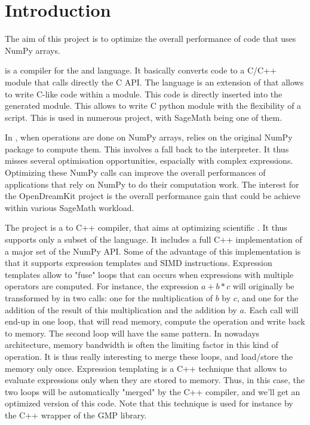 \documentclass{deliverablereport}
\author{Adrien Guinet et Clément Pernet}
\begin{document}
\enlargethispage{.5cm}
\maketitle
\strut\githubissuedescription
\tableofcontents\newpage

\section{Introduction}

The aim of this project is to optimize the overall performance of \Cython code
that uses NumPy arrays.

\Cython is a compiler for the \Python and \Cython language. It basically converts
\Python code to a C/C++ module that calls directly the C \Python API. The \Cython
language is an extension of \Python that allows to write C-like code within a
\Python module. This code is directly inserted into the generated module. This
allows to write C python module with the flexibility of a \Python script. This
is used in numerous \Python project, with SageMath being one of them.

In \Cython, when operations are done on NumPy arrays, \Cython relies on the
original NumPy package to compute them. This involves a fall back to the \Python
interpreter. It thus misses several optimisation opportunities, espacially with
complex expressions. Optimizing these NumPy calls can improve the overall
performances of applications that rely on NumPy to do their computation work.
The interest for the OpenDreamKit project is the overall performance gain that
could be achieve within various SageMath workload.

The \Pythran project is a \Python to C++ compiler, that aims at optimizing
scientific \Python. It thus supports only a subset of the \Python language.
It includes a full C++ implementation of a major set of the NumPy API. Some of
the advantage of this implementation is that it supports expression templates
and SIMD instructions. Expression templates allow to "fuse" loops that can
occurs when expressions with multiple operators are computed. For instance,
the expression $a+b*c$ will originally be transformed by \Cython in two calls: one
for the multiplication of $b$ by $c$, and one for the addition of the result of
this multiplication and the addition by $a$. Each call will end-up in one loop,
that will read memory, compute the operation and write back to memory. The
second loop will have the same pattern. In nowadays architecture, memory
bandwidth is often the limiting factor in this kind of operation. It is thus
really interesting to merge these loops, and load/store the memory only once.
Expression templating is a C++ technique that allows to evaluate expressions
only when they are stored to memory. Thus, in this case, the two loops will be
automatically "merged" by the C++ compiler, and we'll get an optimized version
of this code. Note that this technique is used for instance by the C++ wrapper
of the GMP library.
\end{document}
